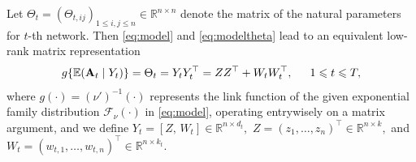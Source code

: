 \documentclass[12pt]{article}
\newcommand{\blue}[1]{\textcolor{blue}{#1}}
\newcommand{\EXPT}{\mathbb{E}}
\newcommand{\mytrans}{\top}
\begin{document}
Let $\Theta_t=(\Theta_{t,ij})_{1\leqslant i,j\leqslant n} \in \mathbb{R}^{n\times n}$ denote the matrix of the natural parameters for $t$-th network.  
Then \eqref{eq:model} and \eqref{eq:modeltheta} lead to an equivalent low-rank matrix representation 
\begin{align}\label{eq:model2}
 g\{\EXPT( \mathbf{A}_t\mid Y_t) \} =
 \Theta_t = Y_t Y_t^{\top} = ZZ^{\top}+W_tW_t^{\top}, \hspace{1.5em} 1\leqslant t\leqslant T, 
\end{align}
where $g(\cdot)= (\nu')^{-1}(\cdot)$ 
represents the link function of the given exponential family distribution $\mathcal{F}_{\nu}(\cdot)$ in \eqref{eq:model},
operating entrywisely on a matrix argument,
and we define   
$ Y_t=[Z,\, W_t] \in \mathbb{R}^{n\times d_t}, $ $ Z=\left(z_1, \ldots, z_n\right)^{\mytrans} \in \mathbb{R}^{n \times k},$ and $ W_t=\left(w_{t,1}, \ldots, w_{t,n}\right)^{\mytrans} \in \mathbb{R}^{n \times k_t}. $
\end{document}
